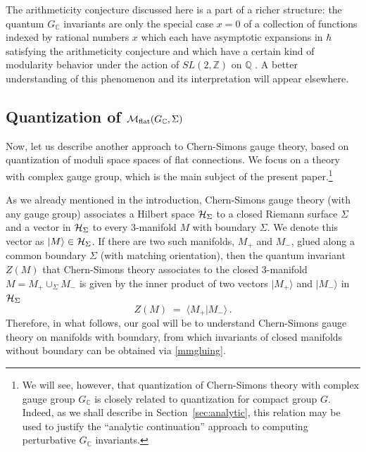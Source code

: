 \documentclass[hyper]{JHEP3}
\def\CH {{\cal H}}
\newcommand{\C}{{\mathbb{C}}}
\newcommand{\Z}{{\mathbb{Z}}}
\newcommand{\M}{{{\cal M}}_{{\rm flat}}}
\newcommand\be{\begin{equation}}
\newcommand\ee{\end{equation}}
\def\={\;=\;}
\begin{document}
The arithmeticity conjecture discussed here is a part of a richer
structure: the quantum $G_{\C}$ invariants are only the special case $x=0$
of a collection of functions indexed by rational numbers $x$
which each have asymptotic expansions in $\hbar$ satisfying
the arithmeticity conjecture and which have a certain kind
of modularity behavior under the action of $SL(2,\Z)$  on $\mathbb{Q}$ \cite{zagMod}.
A better understanding of this phenomenon and its interpretation
will appear elsewhere.



\subsection{Quantization of $\M (G_{\C}, \Sigma)$}
\label{sec:quantization}

Now, let us describe another approach to Chern-Simons gauge theory,
based on quantization of moduli space spaces of flat connections.
We focus on a theory with complex gauge group,
which is the main subject of the present paper.\footnote{We will
see, however, that quantization of Chern-Simons theory with complex gauge group
$G_{\C}$ is closely related to quantization for compact group $G$.
Indeed, as we shall describe in Section~\ref{sec:analytic}, this relation
may be used to justify the ``analytic continuation'' approach to computing
perturbative $G_{\C}$ invariants.}

As we already mentioned in the introduction, Chern-Simons gauge theory
(with any gauge group) associates a Hilbert space $\CH_{\Sigma}$
to a closed Riemann surface $\Sigma$ and a vector in $\CH_{\Sigma}$
to every 3-manifold $M$ with boundary $\Sigma$.
We denote this vector as $\vert M \rangle \in \CH_{\Sigma}$.
If there are two such manifolds, $M_+$ and $M_-$,
glued along a common boundary $\Sigma$ (with matching orientation),
then the quantum invariant $Z(M)$ that Chern-Simons theory associates
to the closed 3-manifold $M = M_+ \cup_{\Sigma} M_-$
is given by the inner product of two vectors
$\vert M_+ \rangle$ and $\vert M_- \rangle$ in $\CH_{\Sigma}$
\be
Z(M) \= \langle M_+ \vert M_- \rangle\,.
\label{mmgluing}
\ee
Therefore, in what follows, our goal will be to understand Chern-Simons
gauge theory on manifolds with boundary, from which invariants of closed manifolds
without boundary can be obtained via \eqref{mmgluing}.
\end{document}
